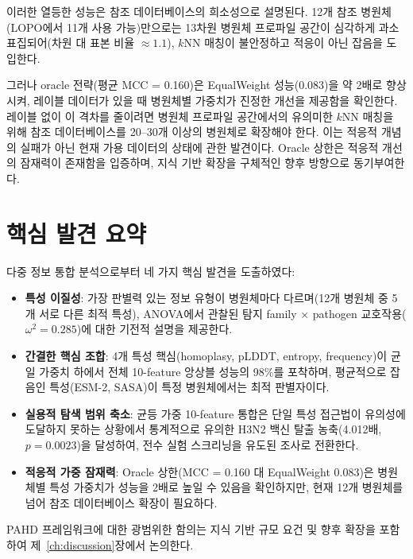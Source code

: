 이러한 열등한 성능은 참조 데이터베이스의 희소성으로 설명된다.
12개 참조 병원체(LOPO에서 11개 사용 가능)만으로는 13차원 병원체 프로파일 공간이 심각하게 과소표집되어(차원 대 표본 비율 $\approx 1.1$), $k$NN 매칭이 불안정하고 적응이 아닌 잡음을 도입한다.

그러나 oracle 전략(평균 MCC = 0.160)은 EqualWeight 성능(0.083)을 약 2배로 향상시켜, 레이블 데이터가 있을 때 병원체별 가중치가 진정한 개선을 제공함을 확인한다.
레이블 없이 이 격차를 줄이려면 병원체 프로파일 공간에서의 유의미한 $k$NN 매칭을 위해 참조 데이터베이스를 20--30개 이상의 병원체로 확장해야 한다.
이는 적응적 개념의 실패가 아닌 현재 가용 데이터의 상태에 관한 발견이다. Oracle 상한은 적응적 개선의 잠재력이 존재함을 입증하며, 지식 기반 확장을 구체적인 향후 방향으로 동기부여한다.

\section{핵심 발견 요약}
\label{sec:adapt_summary}

다중 정보 통합 분석으로부터 네 가지 핵심 발견을 도출하였다:

\begin{itemize}
\item \textbf{특성 이질성}: 가장 판별력 있는 정보 유형이 병원체마다 다르며(12개 병원체 중 5개 서로 다른 최적 특성), ANOVA에서 관찰된 탐지 family $\times$ pathogen 교호작용($\omega^2 = 0.285$)에 대한 기전적 설명을 제공한다.
\item \textbf{간결한 핵심 조합}: 4개 특성 핵심(homoplasy, pLDDT, entropy, frequency)이 균일 가중치 하에서 전체 10-feature 앙상블 성능의 98\%를 포착하며, 평균적으로 잡음인 특성(ESM-2, SASA)이 특정 병원체에서는 최적 판별자이다.
\item \textbf{실용적 탐색 범위 축소}: 균등 가중 10-feature 통합은 단일 특성 접근법이 유의성에 도달하지 못하는 상황에서 통계적으로 유의한 H3N2 백신 탈출 농축(4.012배, $p = 0.0023$)을 달성하여, 전수 실험 스크리닝을 유도된 조사로 전환한다.
\item \textbf{적응적 가중 잠재력}: Oracle 상한(MCC = 0.160 대 EqualWeight 0.083)은 병원체별 특성 가중치가 성능을 2배로 높일 수 있음을 확인하지만, 현재 12개 병원체를 넘어 참조 데이터베이스 확장이 필요하다.
\end{itemize}

PAHD 프레임워크에 대한 광범위한 함의는 지식 기반 규모 요건 및 향후 확장을 포함하여 제~\ref{ch:discussion}장에서 논의한다.
